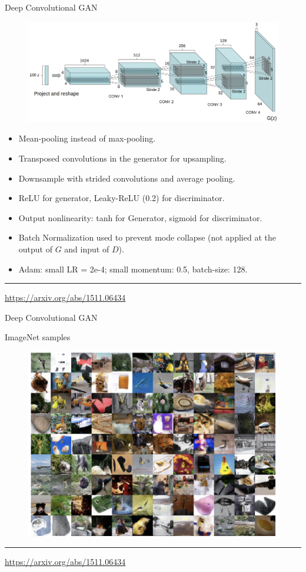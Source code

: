 \documentclass{beamer}
\begin{document}
\begin{frame}{Deep Convolutional GAN}
	\begin{figure}
		\centering
		\includegraphics[width=0.8\linewidth]{figs/dcgan_1}
	\end{figure}
	\begin{itemize}
		\footnotesize
		\item  Mean-pooling instead of max-pooling.
		\item Transposed convolutions in the generator for upsampling.
		\item Downsample with strided convolutions and average pooling.
		\item ReLU for generator, Leaky-ReLU (0.2) for discriminator.
		\item Output nonlinearity: tanh for Generator, sigmoid for discriminator.
		\item Batch Normalization used to prevent mode collapse (not applied at the output of $G$ and input of $D$).
		\item Adam: small LR = 2e-4; small momentum: 0.5, batch-size: 128.
	\end{itemize}
	\vfill
	\hrule\medskip
	{\scriptsize \href{https://arxiv.org/abs/1511.06434}{https://arxiv.org/abs/1511.06434}}
\end{frame}
\begin{frame}{Deep Convolutional GAN}
	\begin{block}{ImageNet samples}
		\begin{figure}
			\centering
			\includegraphics[width=0.8\linewidth]{figs/dcgan_results_1}
		\end{figure}
	\end{block}
	\vfill
	\hrule\medskip
	{\scriptsize \href{https://arxiv.org/abs/1511.06434}{https://arxiv.org/abs/1511.06434}}
\end{frame}
\end{document}
